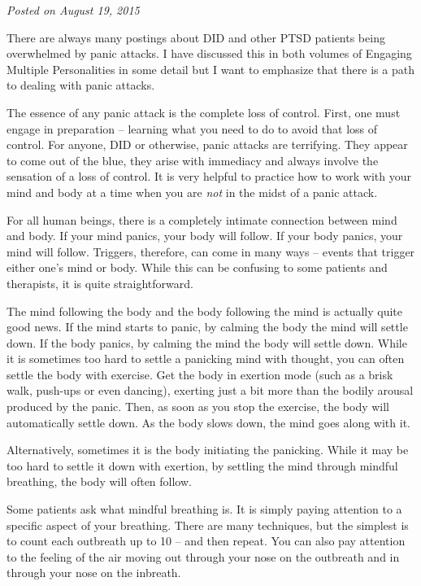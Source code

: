 \documentclass[]{book}
\begin{document}
\emph{Posted on August 19, 2015}

There are always many postings about DID and other PTSD patients being overwhelmed by panic attacks. I have discussed this in both volumes of Engaging Multiple Personalities in some detail but I want to emphasize that there is a path to dealing with panic attacks.

The essence of any panic attack is the complete loss of control. First, one must engage in preparation -- learning what you need to do to avoid that loss of control. For anyone, DID or otherwise, panic attacks are terrifying. They appear to come out of the blue, they arise with immediacy and always involve the sensation of a loss of control. It is very helpful to practice how to work with your mind and body at a time when you are \emph{not} in the midst of a panic attack.

For all human beings, there is a completely intimate connection between mind and body. If your mind panics, your body will follow. If your body panics, your mind will follow. Triggers, therefore, can come in many ways -- events that trigger either one's mind or body. While this can be confusing to some patients and therapists, it is quite straightforward.

The mind following the body and the body following the mind is actually quite good news. If the mind starts to panic, by calming the body the mind will settle down. If the body panics, by calming the mind the body will settle down. While it is sometimes too hard to settle a panicking mind with thought, you can often settle the body with exercise. Get the body in exertion mode (such as a brisk walk, push-ups or even dancing), exerting just a bit more than the bodily arousal produced by the panic. Then, as soon as you stop the exercise, the body will automatically settle down. As the body slows down, the mind goes along with it.

Alternatively, sometimes it is the body initiating the panicking. While it may be too hard to settle it down with exertion, by settling the mind through mindful breathing, the body will often follow.

Some patients ask what mindful breathing is. It is simply paying attention to a specific aspect of your breathing. There are many techniques, but the simplest is to count each outbreath up to 10 -- and then repeat. You can also pay attention to the feeling of the air moving out through your nose on the outbreath and in through your nose on the inbreath.
\end{document}
